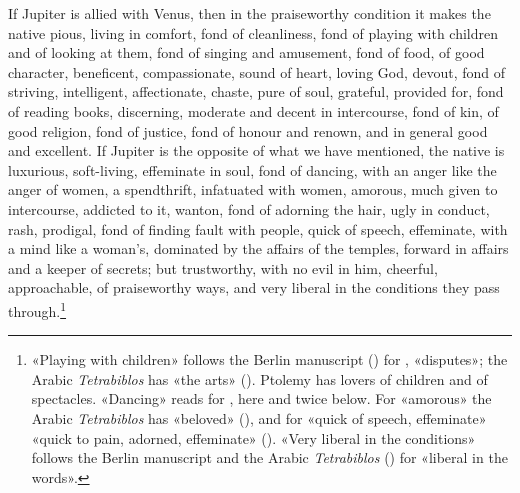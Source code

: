 \documentclass[11pt]{article}
\begin{document}
\par If Jupiter is allied with Venus, then in the praiseworthy condition it makes the native pious, living in comfort, fond of cleanliness, fond of playing with children and of looking at them, fond of singing and amusement, fond of food, of good character, beneficent, compassionate, sound of heart, loving God, devout, fond of striving, intelligent, affectionate, chaste, pure of soul, grateful, provided for, fond of reading books, discerning, moderate and decent in intercourse, fond of kin, of good religion, fond of justice, fond of honour and renown, and in general good and excellent. If Jupiter is the opposite of what we have mentioned, the native is luxurious, soft-living, effeminate in soul, fond of dancing, with an anger like the anger of women, a spendthrift, infatuated with women, amorous, much given to intercourse, addicted to it, wanton, fond of adorning the hair, ugly in conduct, rash, prodigal, fond of finding fault with people, quick of speech, effeminate, with a mind like a woman's, dominated by the affairs of the temples, forward in affairs and a keeper of secrets; but trustworthy, with no evil in him, cheerful, approachable, of praiseworthy ways, and very liberal in the conditions they pass through.\footnote{«Playing with children» follows the Berlin manuscript () for , «disputes»; the Arabic \emph{Tetrabiblos} has «the arts» (). Ptolemy has lovers of children and of spectacles. «Dancing» reads  for , here and twice below. For «amorous» the Arabic \emph{Tetrabiblos} has «beloved» (), and for «quick of speech, effeminate» «quick to pain, adorned, effeminate» (). «Very liberal in the conditions» follows the Berlin manuscript and the Arabic \emph{Tetrabiblos} () for «liberal in the words».}\par
\end{document}
